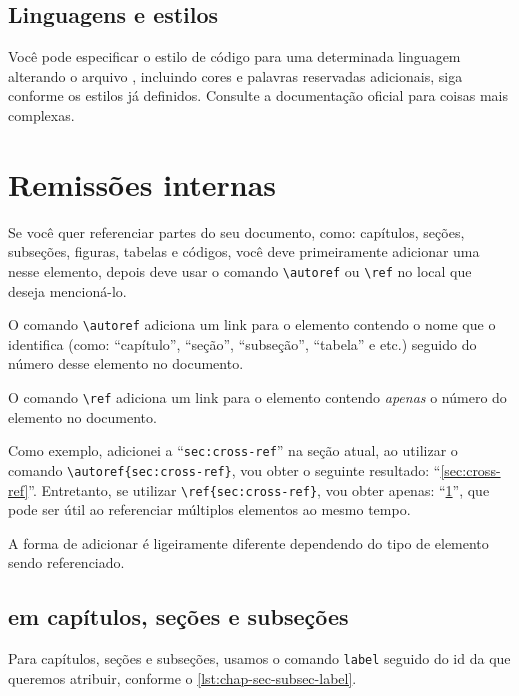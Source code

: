 \subsection{Linguagens e estilos}

Você pode especificar o estilo de código para uma determinada linguagem alterando o arquivo \pkgfile, incluindo cores e palavras reservadas adicionais, siga conforme os estilos já definidos. Consulte a documentação oficial para coisas mais complexas.

\section{Remissões internas} \label{sec:cross-ref}

Se você quer referenciar partes do seu documento, como: capítulos, seções, subseções, figuras, tabelas e códigos, você deve primeiramente adicionar uma  nesse elemento, depois deve usar o comando \texttt{\textbackslash autoref} ou \texttt{\textbackslash ref} no local que deseja mencioná-lo.

O comando \texttt{\textbackslash autoref} adiciona um link para o elemento contendo o nome que o identifica (como: \enquote{capítulo}, \enquote{seção}, \enquote{subseção}, \enquote{tabela} e etc.) seguido do número desse elemento no documento.

O comando \texttt{\textbackslash ref} adiciona um link para o elemento contendo \emph{apenas} o número do elemento no documento.

Como exemplo, adicionei a  \enquote{\texttt{sec:cross-ref}} na seção atual, ao utilizar o comando \texttt{\textbackslash autoref\{sec:cross-ref\}}, vou obter o seguinte resultado: \enquote{\autoref{sec:cross-ref}}. 
Entretanto, se utilizar \texttt{\textbackslash ref\{sec:cross-ref\}}, vou obter apenas: \enquote{\ref{sec:cross-ref}}, que pode ser útil ao referenciar múltiplos elementos ao mesmo tempo.

A forma de adicionar  é ligeiramente diferente dependendo do tipo de elemento sendo referenciado.

\subsection{\Labels em capítulos, seções e subseções}

Para capítulos, seções e subseções, usamos o comando \texttt{label} seguido do id da  que queremos atribuir, conforme o \autoref{lst:chap-sec-subsec-label}.

